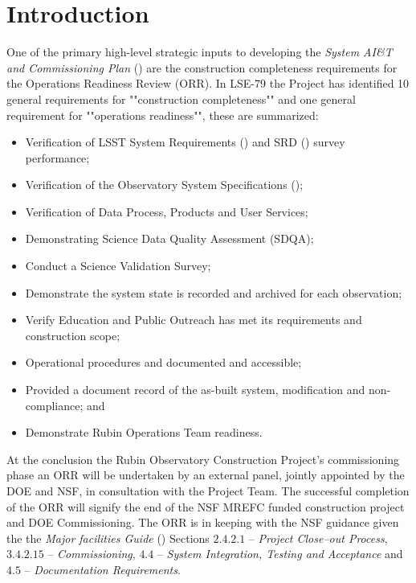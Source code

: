 
\section {Introduction}

One of the primary high-level strategic inputs to developing the {\it System AI\&T and Commissioning Plan} () are the construction completeness requirements for the Operations Readiness Review (ORR).  In LSE-79 the Project has identified 10 general requirements for ""construction completeness"" and one general requirement for ""operations readiness"", these are summarized:

\begin{itemize}
        \item Verification of LSST System Requirements () and SRD () survey performance;
        \item Verification of the Observatory System Specifications ();
        \item Verification of Data Process, Products and User Services;
        \item Demonstrating Science Data Quality Assessment (SDQA);
        \item Conduct a Science Validation Survey;
        \item Demonstrate the system state is recorded and archived for each observation;
        \item Verify Education and Public Outreach has met its requirements and construction scope;
        \item Operational procedures and documented and accessible;
        \item Provided a document record of the as-built system, modification and non-compliance; and
        \item Demonstrate Rubin Operations Team readiness.
\end{itemize}

At the conclusion the Rubin Observatory Construction Project's commissioning phase an ORR will be undertaken by an external panel, jointly appointed by the DOE and NSF, in consultation with the Project Team. The successful completion of the ORR will signify the end of the NSF MREFC funded construction project and DOE Commissioning.  The ORR is in keeping with the NSF guidance given the the {\it Major facilities Guide} () Sections $2.4.2.1$ -- {\it Project Close--out Process}, $3.4.2.15$ -- {\it Commissioning}, $4.4$ -- {\it System Integration, Testing and Acceptance} and $4.5$ -- {\it Documentation Requirements}.

